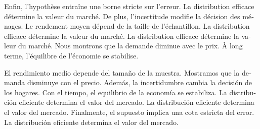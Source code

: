 \documentclass[11pt]{article}
\begin{document}
\begin{french}
Enfin, l'hypothèse entraîne une borne stricte sur l'erreur. La distribution efficace détermine la valeur du marché. De plus, l'incertitude modifie la décision des ménages. Le rendement moyen dépend de la taille de l'échantillon. La distribution efficace détermine la valeur du marché. La distribution efficace détermine la valeur du marché. Nous montrons que la demande diminue avec le prix. À long terme, l'équilibre de l'économie se stabilise.
\end{french}

\begin{spanish}
El rendimiento medio depende del tamaño de la muestra. Mostramos que la demanda disminuye con el precio. Además, la incertidumbre cambia la decisión de los hogares. Con el tiempo, el equilibrio de la economía se estabiliza. La distribución eficiente determina el valor del mercado. La distribución eficiente determina el valor del mercado. Finalmente, el supuesto implica una cota estricta del error. La distribución eficiente determina el valor del mercado.
\end{spanish}
\end{document}
